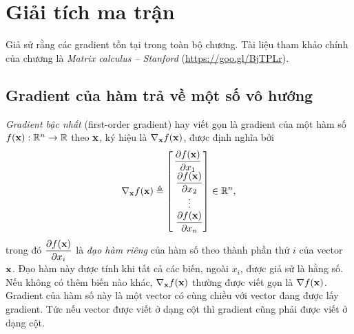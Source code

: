 
\chapter{Giải tích ma trận}

\def\largevspace{\renewcommand{\arraystretch}{2}}
\def\smallvspace{\renewcommand{\arraystretch}{1}}

\vspace{-1.2in}
Giả sử rằng các gradient tồn tại trong toàn bộ chương. Tài liệu tham khảo
chính của chương là \textit{Matrix calculus -- Stanford}
(\url{https://goo.gl/BjTPLr}).

\largevspace
\section{Gradient của hàm trả về một số vô hướng}
\textit{Gradient bậc nhất} ({first-order gradient}) hay viết gọn là
{gradient} của một hàm số $f(\mathbf{x}): \mathbb{R}^n
\rightarrow
\mathbb{R}$
theo $\mathbf{x}$, ký hiệu là $\nabla_{\mathbf{x}} f(\mathbf{x})$, được định nghĩa bởi
\begin{equation}
\label{eqn:grvector1}
\nabla_{\mathbf{x}} f(\mathbf{x}) \triangleq
\left[
\begin{matrix}
\dfrac{\partial f(\mathbf{x})}{\partial x_1} \\\
\dfrac{\partial f(\mathbf{x})}{\partial x_2} \\\
\vdots \\\
\dfrac{\partial f(\mathbf{x})}{\partial x_n}
\end{matrix}
\right] \in \mathbb{R}^n,
\end{equation}
trong đó $\displaystyle\dfrac{\partial f(\mathbf{x})}{\partial x_i}$ là \textit{đạo hàm
riêng} của hàm số theo thành phần thứ $i$ của
vector $\mathbf{x}$. Đạo hàm này được tính khi tất cả các biến, ngoài $x_i$, được giả sử
là hằng số. Nếu không có thêm biến nào khác, $\nabla_{\mathbf{x}}f(\mathbf{x})$ thường được
viết gọn là $\nabla f(\mathbf{x})$. {Gradient của hàm số này là một vector có
cùng chiều với vector đang được lấy gradient}. Tức nếu vector được viết ở dạng
cột thì gradient cũng phải được viết ở dạng cột.%

